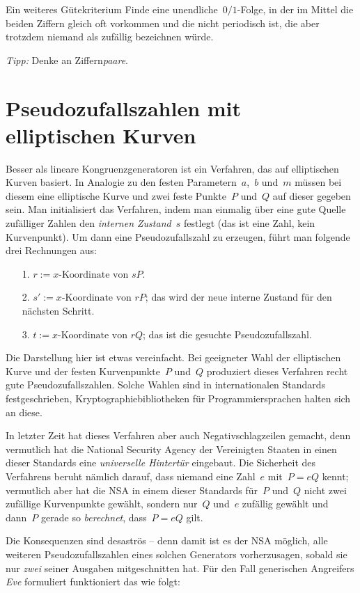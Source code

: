 \documentclass{zirkelblatt}
\newcommand{\head}[1]{\section*{\rmfamily #1}}%
\begin{document}
\begin{aufgabeShaded}{Ein weiteres Gütekriterium}
Finde eine unendliche~$0/1$-Folge, in der im Mittel die beiden Ziffern gleich
oft vorkommen und die nicht periodisch ist, die aber trotzdem niemand als
zufällig bezeichnen würde.

\emph{Tipp:} Denke an Ziffern\emph{paare}.
\end{aufgabeShaded}


\head{Pseudozufallszahlen mit elliptischen Kurven}

Besser als lineare Kongruenzgeneratoren ist ein Verfahren, das auf elliptischen
Kurven basiert. In Analogie zu den festen Parametern~$a$,~$b$ und~$m$ müssen bei
diesem eine elliptische Kurve und zwei feste Punkte~$P$ und~$Q$ auf dieser
gegeben sein. Man initialisiert das Verfahren, indem man einmalig über eine
gute Quelle zufälliger Zahlen den \emph{internen Zustand~$s$} festlegt (das ist
eine Zahl, kein Kurvenpunkt). Um dann eine Pseudozufallszahl zu erzeugen,
führt man folgende drei Rechnungen aus:

\begin{enumerate}
\item[1.] $r := \text{$x$-Koordinate von~$sP$}$.
\item[2.] $s' := \text{$x$-Koordinate von~$rP$}$; das wird der neue interne Zustand
für den nächsten Schritt.
\item[3.] $t := \text{$x$-Koordinate von~$rQ$}$; das ist die gesuchte
Pseudozufallszahl.
\end{enumerate}

Die Darstellung hier ist etwas vereinfacht. Bei geeigneter Wahl der
elliptischen Kurve und der festen Kurvenpunkte~$P$ und~$Q$ produziert dieses
Verfahren recht gute Pseudozufallszahlen. Solche Wahlen sind in internationalen
Standards festgeschrieben, Kryptographiebibliotheken für Programmiersprachen
halten sich an diese.

In letzter Zeit hat dieses Verfahren aber auch Negativschlagzeilen gemacht,
denn vermutlich hat die National Security Agency der Vereinigten Staaten in
einen dieser Standards eine \emph{universelle Hintertür} eingebaut. Die
Sicherheit des Verfahrens beruht nämlich darauf, dass niemand eine Zahl~$e$
mit~$P = eQ$ kennt; vermutlich aber hat die NSA in einem dieser Standards
für~$P$ und~$Q$ nicht zwei zufällige Kurvenpunkte gewählt, sondern nur~$Q$
und~$e$ zufällig gewählt und dann~$P$ gerade so \emph{berechnet}, dass~$P = eQ$
gilt.

Die Konsequenzen sind desaströs -- denn damit ist es der NSA möglich,
alle weiteren Pseudozufallszahlen eines solchen Generators vorherzusagen,
sobald sie nur \emph{zwei} seiner Ausgaben mitgeschnitten hat.
Für den Fall generischen Angreifers \emph{Eve} formuliert funktioniert das wie folgt:
\end{document}
